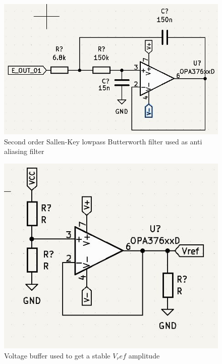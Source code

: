 \begin{figure} [H]
\begin{center}
\includegraphics[scale=0.65]{images/Antialiasing.jpg}
   \caption{Second order Sallen-Key lowpass Butterworth filter used as anti aliasing filter}
    \label{fig:LPaliasfilter}
\end{center}
\end{figure}

\begin{figure} [H]
\begin{center}
\includegraphics[scale=0.8]{images/Voltagebuffer.jpg}
   \caption{Voltage buffer used to get a stable $V_ref$ amplitude}
    \label{fig:Vbuff}
\end{center}
\end{figure}

